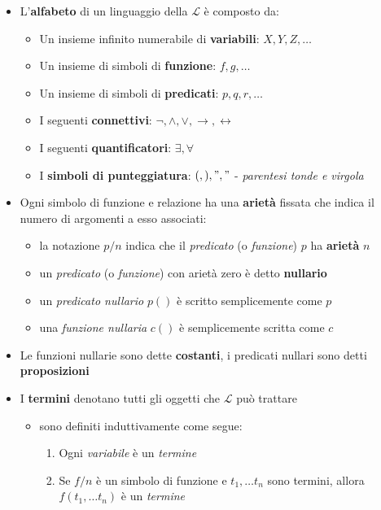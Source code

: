 \documentclass[italian, 10pt]{article}
\begin{document}
\begin{itemize}
  \item L'\textbf{alfabeto} di un linguaggio della \FOL \(\mathcal{L}\) è composto da:
        \begin{itemize}
          \item Un insieme infinito numerabile di \textbf{variabili}: \(X, Y, Z, \ldots\)
          \item Un insieme di simboli di \textbf{funzione}: \(f, g, \ldots\)
          \item Un insieme di simboli di \textbf{predicati}: \(p, q, r, \ldots\)
          \item I seguenti \textbf{connettivi}: \(\lnot, \land, \lor, \rightarrow, \leftrightarrow\)
          \item I seguenti \textbf{quantificatori}: \(\exists, \forall\)
          \item I \textbf{simboli di punteggiatura}: \((, ), ","\) - \textit{parentesi tonde e virgola}
        \end{itemize}
  \item Ogni simbolo di funzione e relazione ha una \textbf{arietà} fissata che indica il numero di argomenti a esso associati:
        \begin{itemize}
          \item la notazione \(p/n\) indica che il \textit{predicato} (o \textit{funzione}) \(p\) ha \textbf{arietà} \(n\)
          \item un \textit{predicato} (o \textit{funzione}) con arietà zero è detto \textbf{nullario}
          \item un \textit{predicato nullario} \(p()\) è scritto semplicemente come \(p\)
          \item una \textit{funzione nullaria} \(c()\) è semplicemente scritta come \(c\)
        \end{itemize}
  \item Le funzioni nullarie sono dette \textbf{costanti}, i predicati nullari sono detti \textbf{proposizioni}
  \item I \textbf{termini} denotano tutti gli oggetti che \(\mathcal{L}\) può trattare
        \begin{itemize}
          \item sono definiti induttivamente come segue:
                \begin{enumerate}
                  \item Ogni \textit{variabile} è un \textit{termine}
                  \item Se \(f/n\) è un simbolo di funzione e \(t_1, \ldots t_n\) sono termini, allora \(f (t_1, \ldots t_n)\) è un \textit{termine}

\end{enumerate}
\end{itemize}
\end{itemize}
\end{document}
